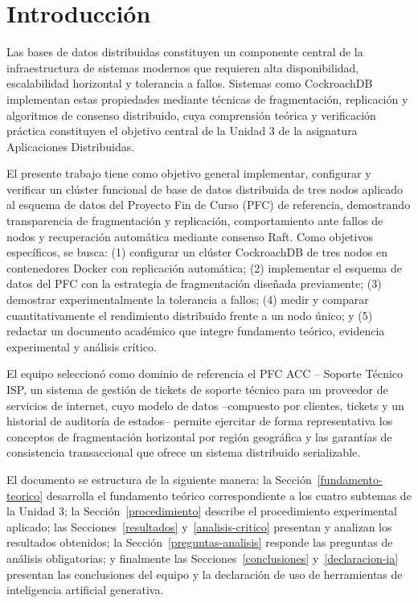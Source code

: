 \documentclass[12pt, a4paper]{article}
\begin{document}
\section*{Introducción}

Las bases de datos distribuidas constituyen un componente central de la infraestructura de sistemas modernos que requieren alta disponibilidad, escalabilidad horizontal y tolerancia a fallos. Sistemas como CockroachDB implementan estas propiedades mediante técnicas de fragmentación, replicación y algoritmos de consenso distribuido, cuya comprensión teórica y verificación práctica constituyen el objetivo central de la Unidad 3 de la asignatura Aplicaciones Distribuidas.

El presente trabajo tiene como objetivo general implementar, configurar y verificar un clúster funcional de base de datos distribuida de tres nodos aplicado al esquema de datos del Proyecto Fin de Curso (PFC) de referencia, demostrando transparencia de fragmentación y replicación, comportamiento ante fallos de nodos y recuperación automática mediante consenso Raft. Como objetivos específicos, se busca: (1) configurar un clúster CockroachDB de tres nodos en contenedores Docker con replicación automática; (2) implementar el esquema de datos del PFC con la estrategia de fragmentación diseñada previamente; (3) demostrar experimentalmente la tolerancia a fallos; (4) medir y comparar cuantitativamente el rendimiento distribuido frente a un nodo único; y (5) redactar un documento académico que integre fundamento teórico, evidencia experimental y análisis crítico.

El equipo seleccionó como dominio de referencia el PFC ACC -- Soporte Técnico ISP, un sistema de gestión de tickets de soporte técnico para un proveedor de servicios de internet, cuyo modelo de datos --compuesto por clientes, tickets y un historial de auditoría de estados-- permite ejercitar de forma representativa los conceptos de fragmentación horizontal por región geográfica y las garantías de consistencia transaccional que ofrece un sistema distribuido serializable.

El documento se estructura de la siguiente manera: la Sección~\ref{fundamento-teorico} desarrolla el fundamento teórico correspondiente a los cuatro subtemas de la Unidad 3; la Sección~\ref{procedimiento} describe el procedimiento experimental aplicado; las Secciones~\ref{resultados} y~\ref{analisis-critico} presentan y analizan los resultados obtenidos; la Sección~\ref{preguntas-analisis} responde las preguntas de análisis obligatorias; y finalmente las Secciones~\ref{conclusiones} y~\ref{declaracion-ia} presentan las conclusiones del equipo y la declaración de uso de herramientas de inteligencia artificial generativa.
\end{document}
